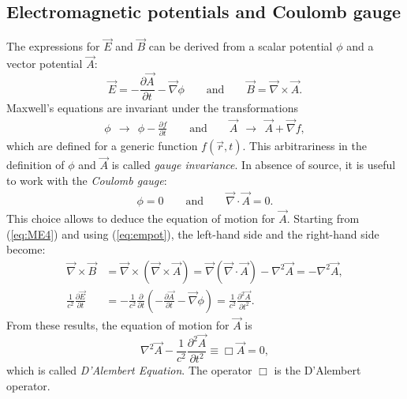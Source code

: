 \subsection{Electromagnetic potentials and Coulomb gauge}
\label{subsec:3.1.1}
The expressions for $\vec{E}$ and $\vec{B}$ can be derived from a scalar potential $\phi$ and a vector potential $\vec{A}$: 
\begin{equation}
    \vec{E}=-\frac{\partial \vec{A}}{\partial t} - \vec{\nabla}\phi \qquad \text{and} \qquad \vec{B}=\vec{\nabla}\times\vec{A}. 
    \label{eq:empot}
\end{equation}
Maxwell's equations are invariant under the transformations
\begin{align*}
    \phi ~~\longrightarrow ~~ \phi - \frac{\partial f}{\partial t}  \qquad \text{and} \qquad \vec{A}~~\longrightarrow ~~ \vec{A} + \vec{\nabla} f, 
\end{align*}
which are defined for a generic function $f(\vec{r},t)$. This arbitrariness in the definition of $\phi$ and $\vec{A}$ is called \textit{gauge invariance}. In absence of source, it is useful to work with the \textit{Coulomb gauge}: 
\begin{align}
    \phi=0 \qquad \text{and} \qquad \vec{\nabla}\cdot \vec{A}=0. 
\end{align}
This choice allows to deduce the equation of motion for $\vec{A}$. Starting from (\ref{eq:ME4}) and using (\ref{eq:empot}), the left-hand side and the right-hand side become: 
\begin{align}
    \vec{\nabla}\times\vec{B}&=\vec{\nabla}\times(\vec{\nabla}\times\vec{A}) =\vec{\nabla}(\vec{\nabla}\cdot \vec{A})-\nabla^{2}\vec{A} = -\nabla^{2}\vec{A}, \\
    \frac{1}{c^{2}}\frac{\partial \vec{E}}{\partial t} &= -\frac{1}{c^{2}}\frac{\partial }{\partial t} \left( -\frac{\partial \vec{A}}{\partial t} - \vec{\nabla}\phi \right) = \frac{1}{c^2} \frac{\partial^2 \vec{A}}{\partial t^2}. 
\end{align}
From these results, the equation of motion for $\vec{A}$ is
\begin{equation}
    \nabla^{2}\vec{A}-\frac{1}{c^{2}}\frac{\partial^{2}\vec{A}}{\partial t^{2}} \equiv \Box \vec{A} = 0 \label{dal}, 
\end{equation}
which is called \textit{D'Alembert Equation}. The operator $\Box$ is the D'Alembert operator. 

